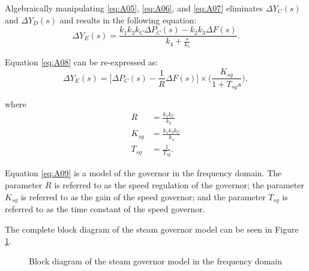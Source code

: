 Algebraically manipulating \ref{eq:A05}, \ref{eq:A06}, and \ref{eq:A07} eliminates $\Delta Y_C(s)$ and $\Delta Y_D(s)$ and results in the following equation:
\begin{equation}
	\Delta Y_E(s) = \frac{k_1 k_3 k_C \Delta P_C(s) - k_2 k_3 \Delta F(s)}{k_4 + \frac{s}{k_5}}. \label{eq:A08}
\end{equation}

Equation \ref{eq:A08} can be re-expressed as:
\begin{equation}
	\Delta Y_E(s) = \bigg[ \Delta P_C(s) - \frac{1}{R} \Delta F(s) \bigg] \times \bigg( \frac{K_{sg}}{1 + T_{sg}s} \bigg), \label{eq:A09}
\end{equation}

where
\begin{align}
	R &= \frac{k_1 k_C}{k_2} \\
	K_{sg} &= \frac{k_1 k_3 k_C}{k_4} \\
	T_{sg} &= \frac{1}{T_{sg}}.
\end{align}

Equation \ref{eq:A09} is a model of the governor in the frequency domain. The parameter $R$ is referred to as the speed regulation of the governor; the parameter $K_{sg}$ is referred to as the gain of the speed governor; and the parameter $T_{sg}$ is referred to as the time constant of the speed governor.

The complete block diagram of the steam governor model can be seen in Figure \ref{fig:A02_governor_model}.

\begin{figure}[h]
	\centering
	
	\caption[Steam governor model]{Block diagram of the steam governor model in the frequency domain}
	\label{fig:A02_governor_model}
\end{figure}